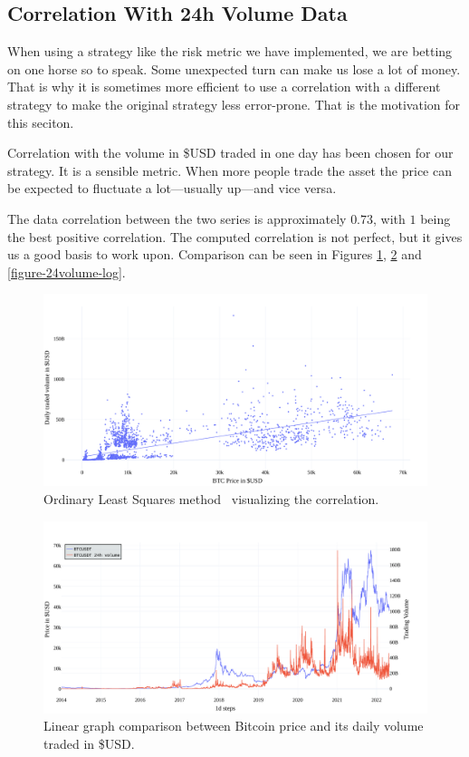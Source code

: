\subsection*{Correlation With 24h Volume Data}
\label{subsection-24hvolume-correlation}
When using a strategy like the risk metric we have implemented, we are betting on one horse so to speak. Some unexpected turn can make us lose a lot of money. That is why it is sometimes more efficient to use a correlation with a different strategy to make the original strategy less error-prone. That is the motivation for this seciton.

Correlation with the volume in \$USD traded in one day has been chosen for our strategy. It is a sensible metric. When more people trade the asset the price can be expected to fluctuate a lot---usually up---and vice versa.

The data correlation between the two series is approximately $0.73$, with $1$ being the best positive correlation. The computed correlation is not perfect, but it gives us a good basis to work upon. Comparison can be seen in Figures \ref{figure-24volume-ols}, \ref{figure-24volume-lin} and \ref{figure-24volume-log}.

\begin{figure}[!hbt]
    \centering
    \includegraphics[width=\columnwidth]{figures/24volume-ols.pdf}
    \caption{Ordinary Least Squares method~\cite{wikipedia:ols} visualizing the correlation.}
    \label{figure-24volume-ols}
\end{figure}

\begin{figure}[!hbt]
    \centering
    \includegraphics[width=\columnwidth]{figures/24volume-lin.pdf}
    \caption{Linear graph comparison between Bitcoin price and its daily volume traded in \$USD.}
    \label{figure-24volume-lin}
\end{figure}

